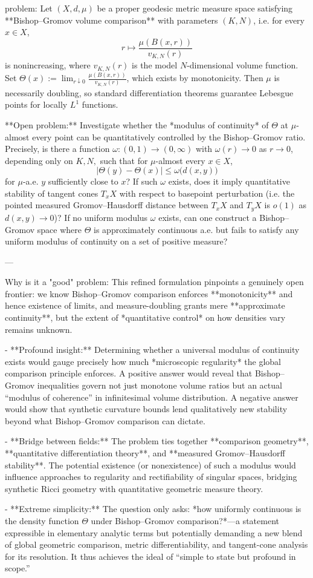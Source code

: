 problem:  
Let \((X,d,\mu)\) be a proper geodesic metric measure space satisfying **Bishop–Gromov volume comparison** with parameters \((K,N)\), i.e. for every \(x\in X\),
\[
r\mapsto \frac{\mu(B(x,r))}{v_{K,N}(r)}
\]
is nonincreasing, where \(v_{K,N}(r)\) is the model \(N\)-dimensional volume function.  
Set \(\Theta(x):=\lim_{r\downarrow 0}\frac{\mu(B(x,r))}{v_{K,N}(r)}\), which exists by monotonicity.  
Then \(\mu\) is necessarily doubling, so standard differentiation theorems guarantee Lebesgue points for locally \(L^1\) functions.  

**Open problem:**  
Investigate whether the *modulus of continuity* of \(\Theta\) at \(\mu\)-almost every point can be quantitatively controlled by the Bishop–Gromov ratio.  
Precisely, is there a function \(\omega:(0,1)\to (0,\infty)\) with \(\omega(r)\to 0\) as \(r\to0\), depending only on \(K,N,\) such that for \(\mu\)-almost every \(x\in X\),
\[
\biggl|\Theta(y)-\Theta(x)\biggr| \le \omega\bigl(d(x,y)\bigr)
\]
for \(\mu\)-a.e. \(y\) sufficiently close to \(x\)?  
If such \(\omega\) exists, does it imply quantitative stability of tangent cones \(T_xX\) with respect to basepoint perturbation (i.e. the pointed measured Gromov–Hausdorff distance between \(T_{x}X\) and \(T_{y}X\) is \(o(1)\) as \(d(x,y)\to0\))?  
If no uniform modulus \(\omega\) exists, can one construct a Bishop–Gromov space where \(\Theta\) is approximately continuous a.e. but fails to satisfy any uniform modulus of continuity on a set of positive measure?

---

Why is it a "good" problem:  
This refined formulation pinpoints a genuinely open frontier: we know Bishop–Gromov comparison enforces **monotonicity** and hence existence of limits, and measure-doubling grants mere **approximate continuity**, but the extent of *quantitative control* on how densities vary remains unknown.  

- **Profound insight:**  
  Determining whether a universal modulus of continuity exists would gauge precisely how much *microscopic regularity* the global comparison principle enforces. A positive answer would reveal that Bishop–Gromov inequalities govern not just monotone volume ratios but an actual “modulus of coherence” in infinitesimal volume distribution. A negative answer would show that synthetic curvature bounds lend qualitatively new stability beyond what Bishop–Gromov comparison can dictate.  

- **Bridge between fields:**  
  The problem ties together **comparison geometry**, **quantitative differentiation theory**, and **measured Gromov–Hausdorff stability**. The potential existence (or nonexistence) of such a modulus would influence approaches to regularity and rectifiability of singular spaces, bridging synthetic Ricci geometry with quantitative geometric measure theory.  

- **Extreme simplicity:**  
  The question only asks: *how uniformly continuous is the density function \(\Theta\) under Bishop–Gromov comparison?*—a statement expressible in elementary analytic terms but potentially demanding a new blend of global geometric comparison, metric differentiability, and tangent-cone analysis for its resolution. It thus achieves the ideal of “simple to state but profound in scope.”